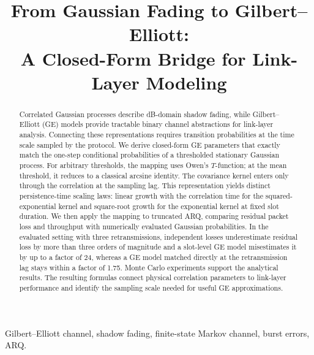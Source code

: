 \documentclass[conference]{IEEEtran}
\begin{document}
\title{From Gaussian Fading to Gilbert--Elliott:\\ A Closed-Form Bridge for Link-Layer Modeling}

\author{
}

\maketitle

\begin{abstract}
Correlated Gaussian processes describe dB-domain shadow fading, while Gilbert--Elliott (GE) models provide tractable binary channel abstractions for link-layer analysis. Connecting these representations requires transition probabilities at the time scale sampled by the protocol. We derive closed-form GE parameters that exactly match the one-step conditional probabilities of a thresholded stationary Gaussian process. For arbitrary thresholds, the mapping uses Owen's $T$-function; at the mean threshold, it reduces to a classical arcsine identity. The covariance kernel enters only through the correlation at the sampling lag. This representation yields distinct persistence-time scaling laws: linear growth with the correlation time for the squared-exponential kernel and square-root growth for the exponential kernel at fixed slot duration. We then apply the mapping to truncated ARQ, comparing residual packet loss and throughput with numerically evaluated Gaussian probabilities. In the evaluated setting with three retransmissions, independent losses underestimate residual loss by more than three orders of magnitude and a slot-level GE model misestimates it by up to a factor of 24, whereas a GE model matched directly at the retransmission lag stays within a factor of 1.75. Monte Carlo experiments support the analytical results. The resulting formulas connect physical correlation parameters to link-layer performance and identify the sampling scale needed for useful GE approximations.
\end{abstract}

\begin{IEEEkeywords}
Gilbert--Elliott channel, shadow fading, finite-state Markov channel, burst errors, ARQ.
\end{IEEEkeywords}
\end{document}
